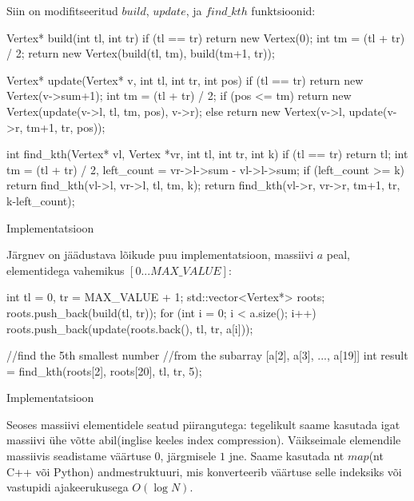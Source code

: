 \documentclass{trkut}
\begin{document}
Siin on modifitseeritud $build$, $update$, ja $find \_ kth$ funktsioonid:
\begin{cclol}
Vertex* build(int tl, int tr) {
    if (tl == tr)
        return new Vertex(0);
    int tm = (tl + tr) / 2;
    return new Vertex(build(tl, tm), build(tm+1, tr));
}

Vertex* update(Vertex* v, int tl, int tr, int pos) {
    if (tl == tr)
        return new Vertex(v->sum+1);
    int tm = (tl + tr) / 2;
    if (pos <= tm)
        return new Vertex(update(v->l, tl, tm, pos), v->r);
    else
        return new Vertex(v->l, update(v->r, tm+1, tr, pos));
}

int find_kth(Vertex* vl, Vertex *vr, int tl, int tr, int k) {
    if (tl == tr)
        return tl;
    int tm = (tl + tr) / 2, left_count = vr->l->sum - vl->l->sum;
    if (left_count >= k)
        return find_kth(vl->l, vr->l, tl, tm, k);
    return find_kth(vl->r, vr->r, tm+1, tr, k-left_count);
}
\end{cclol}
\begin{kk}[H]%
    \caption{Implementatsioon}%
    \label{EMaxx}%
    \end{kk}

Järgnev on jäädustava lõikude puu implementatsioon, massiivi $a$ peal, elementidega vahemikus $[0...MAX \_ VALUE]$:
\begin{cclol}
int tl = 0, tr = MAX_VALUE + 1;
std::vector<Vertex*> roots;
roots.push_back(build(tl, tr));
for (int i = 0; i < a.size(); i++) {
    roots.push_back(update(roots.back(), tl, tr, a[i]));
}

//find the 5th smallest number 
//from the subarray [a[2], a[3], ..., a[19]]
int result = find_kth(roots[2], roots[20], tl, tr, 5);
\end{cclol}
\begin{kk}[H]%
    \caption{Implementatsioon}%
    \label{EMaxx}%
    \end{kk}

Seoses massiivi elementidele seatud piirangutega: tegelikult saame kasutada igat massiivi ühe võtte abil(inglise keeles index compression). Väikseimale elemendile massiivis seadistame väärtuse $0$, järgmisele $1$ jne. Saame kasutada nt $map$(nt C++ või Python) andmestruktuuri, mis konverteerib väärtuse selle indeksiks või vastupidi ajakeerukusega $O(\log N)$.
\end{document}
